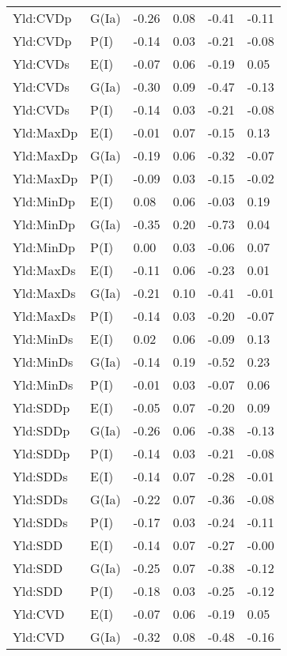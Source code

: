 \begin{center}
\begin{longtable}{|p{1.1in}|p{0.7in}|p{0.7in}|p{0.6in}|p{0.6in}|p{0.6in}|}
  Yld:CVDp & G(Ia) & -0.26 & 0.08 & -0.41 & -0.11 \\ 
  Yld:CVDp & P(I) & -0.14 & 0.03 & -0.21 & -0.08 \\ 
  Yld:CVDs & E(I) & -0.07 & 0.06 & -0.19 & 0.05 \\ 
  Yld:CVDs & G(Ia) & -0.30 & 0.09 & -0.47 & -0.13 \\ 
  Yld:CVDs & P(I) & -0.14 & 0.03 & -0.21 & -0.08 \\ 
  Yld:MaxDp & E(I) & -0.01 & 0.07 & -0.15 & 0.13 \\ 
  Yld:MaxDp & G(Ia) & -0.19 & 0.06 & -0.32 & -0.07 \\ 
  Yld:MaxDp & P(I) & -0.09 & 0.03 & -0.15 & -0.02 \\ 
  Yld:MinDp & E(I) & 0.08 & 0.06 & -0.03 & 0.19 \\ 
  Yld:MinDp & G(Ia) & -0.35 & 0.20 & -0.73 & 0.04 \\ 
  Yld:MinDp & P(I) & 0.00 & 0.03 & -0.06 & 0.07 \\ 
  Yld:MaxDs & E(I) & -0.11 & 0.06 & -0.23 & 0.01 \\ 
  Yld:MaxDs & G(Ia) & -0.21 & 0.10 & -0.41 & -0.01 \\ 
  Yld:MaxDs & P(I) & -0.14 & 0.03 & -0.20 & -0.07 \\ 
  Yld:MinDs & E(I) & 0.02 & 0.06 & -0.09 & 0.13 \\ 
  Yld:MinDs & G(Ia) & -0.14 & 0.19 & -0.52 & 0.23 \\ 
  Yld:MinDs & P(I) & -0.01 & 0.03 & -0.07 & 0.06 \\ 
  Yld:SDDp & E(I) & -0.05 & 0.07 & -0.20 & 0.09 \\ 
  Yld:SDDp & G(Ia) & -0.26 & 0.06 & -0.38 & -0.13 \\ 
  Yld:SDDp & P(I) & -0.14 & 0.03 & -0.21 & -0.08 \\ 
  Yld:SDDs & E(I) & -0.14 & 0.07 & -0.28 & -0.01 \\ 
  Yld:SDDs & G(Ia) & -0.22 & 0.07 & -0.36 & -0.08 \\ 
  Yld:SDDs & P(I) & -0.17 & 0.03 & -0.24 & -0.11 \\ 
  Yld:SDD & E(I) & -0.14 & 0.07 & -0.27 & -0.00 \\ 
  Yld:SDD & G(Ia) & -0.25 & 0.07 & -0.38 & -0.12 \\ 
  Yld:SDD & P(I) & -0.18 & 0.03 & -0.25 & -0.12 \\ 
  Yld:CVD & E(I) & -0.07 & 0.06 & -0.19 & 0.05 \\ 
  Yld:CVD & G(Ia) & -0.32 & 0.08 & -0.48 & -0.16 \\ 

\end{longtable}
\end{center}
